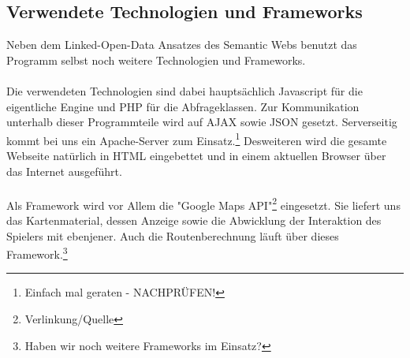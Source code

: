 \documentclass[a4paper, 11pt]{article}
\begin{document}
\subsection{Verwendete Technologien und Frameworks}
Neben dem Linked-Open-Data Ansatzes des Semantic Webs benutzt das Programm selbst noch weitere Technologien und Frameworks.\\\\
Die verwendeten Technologien sind dabei hauptsächlich Javascript für die eigentliche Engine und PHP für die Abfrageklassen. Zur Kommunikation unterhalb dieser Programmteile wird auf AJAX sowie JSON gesetzt. Serverseitig kommt bei uns ein Apache-Server zum Einsatz.\footnote{Einfach mal geraten - NACHPRÜFEN!} Desweiteren wird die gesamte Webseite natürlich in HTML eingebettet und in einem aktuellen Browser über das Internet ausgeführt.\\\\
Als Framework wird vor Allem die "Google Maps API"\footnote{Verlinkung/Quelle} eingesetzt. Sie liefert uns das Kartenmaterial, dessen Anzeige sowie die Abwicklung der Interaktion des Spielers mit ebenjener. Auch die Routenberechnung läuft über dieses Framework.\footnote{Haben wir noch weitere Frameworks im Einsatz?}
\end{document}
